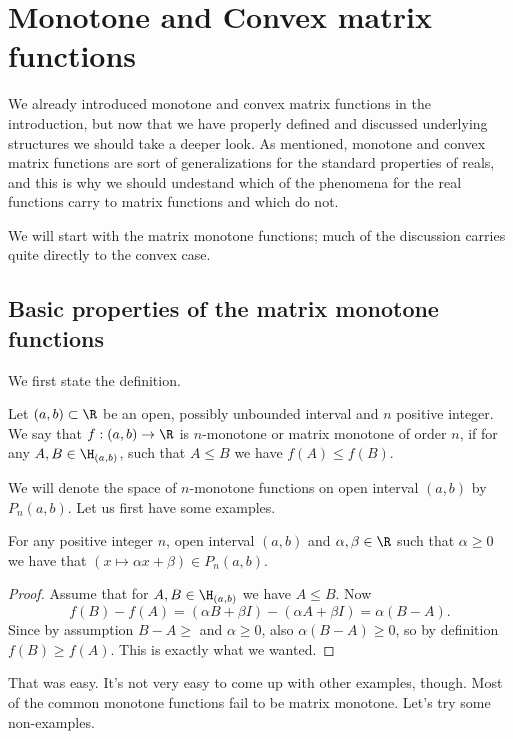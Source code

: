 \chapter{Monotone and Convex matrix functions}

We already introduced monotone and convex matrix functions in the introduction, but now that we have properly defined and discussed underlying structures we should take a deeper look. As mentioned, monotone and convex matrix functions are sort of generalizations for the standard properties of reals, and this is why we should undestand which of the phenomena for the real functions carry to matrix functions and which do not.

We will start with the matrix monotone functions; much of the discussion carries quite directly to the convex case.

\section{Basic properties of the matrix monotone functions}

We first state the definition.

\begin{maar}
	Let $(a,b) \subset \R$ be an open, possibly unbounded interval and $n$ positive integer. We say that $f : (a, b) \to \R$ is $n$-monotone or matrix monotone of order $n$, if for any $A, B \in \H_{(a, b)}$, such that $A \leq B$ we have $f(A) \leq f(B)$.
\end{maar}

We will denote the space of $n$-monotone functions on open interval $(a, b)$ by $P_{n}(a, b)$. Let us first have some examples.

\begin{prop}
	For any positive integer $n$, open interval $(a, b)$ and $\alpha, \beta \in \R$ such that $\alpha \geq 0$ we have that $(x \mapsto \alpha x + \beta) \in P_{n}(a, b)$.
\end{prop}
\begin{proof}
	Assume that for $A, B \in \H_{(a, b)}$ we have $A \leq B$. Now
	\[
		f(B) - f(A) = (\alpha B + \beta I) - (\alpha A + \beta I) = \alpha (B - A).
	\]
	Since by assumption $B - A \geq $ and $\alpha \geq 0$, also $\alpha (B - A) \geq 0$, so by definition $f(B) \geq f(A)$. This is exactly what we wanted.
\end{proof}

That was easy. It's not very easy to come up with other examples, though. Most of the common monotone functions fail to be matrix monotone. Let's try some non-examples.

